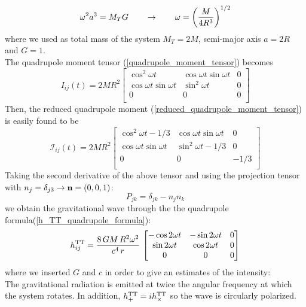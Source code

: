 \[
\omega ^{2} 
a^{3} = M_T G 
\qquad
\rightarrow
\qquad 
\omega = \qty(\dfrac{M}{4R^{3}})^{1/2}
\]
where we used as total mass of the system $M_T = 2M$, semi-major axis $a=2R$ and $G=1$.\\
The quadrupole moment tensor (\ref{quadrupole_moment_tensor}) becomes
\[
I_{ij}(t) =
2 M R^{2}
\begin{bmatrix}
 \cos ^{2} \omega t  &
 \cos \omega t \sin \omega t &
0
\\
 \cos \omega t \sin \omega t &
 \sin ^{2} \omega t &
0
\\
0 & 0 & 0\\
\end{bmatrix} 
\]
Then, the reduced quadrupole moment (\ref{reduced_quadrupole_moment_tensor}) is easily found to be
\[
\mathcal{I} _{ij}(t) =
2 M R^{2}
\begin{bmatrix}
 \cos ^{2} \omega t -1/3  &
 \cos \omega t \sin \omega t &
0
\\
 \cos \omega t \sin \omega t &
 \sin ^{2} \omega t -1/3&
0
\\
0 & 0 & -1/3\\
\end{bmatrix} 
\]
Taking the second derivative of the above tensor and using the projection tensor with $n_{j} =\delta_{j3} \rightarrow \vb{n} = (0,0,1)$:
\[
P_{jk} = \delta_{jk}- n_{j} n_{k}
\]
we obtain the gravitational wave through the the quadrupole formula(\ref{h_TT_quadrupole_formula}):
\[
h^{\text{TT}} _{ij} = \dfrac{8\,G M \,R^{2} \omega^{2}}{c^{4}\, r} \,
\begin{bmatrix}
- \cos 2 \omega t   &
 - \sin 2 \omega t &
0
\\
  \sin 2 \omega t &
 \cos 2 \omega t &
0
\\
0 & 0 & 0\\
\end{bmatrix}
\]
where we inserted $G$ and $c$ in order to give an estimates of the intensity:
\[
\]
The gravitational radiation is emitted at  twice the angular frequency at which the system rotates.
In addition, $h_{+} ^{\text{TT}}= i h_{\times} ^{\text{TT}}$ so the wave is circularly polarized.\\
